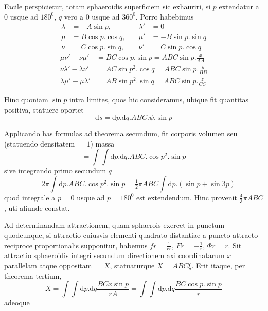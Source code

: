 \par
Facile perspicietur, totam sphaeroidis superficiem sic exhauriri, si $p$ extendatur a $0$ usque ad $180^0$, $q$ vero a $0$ usque ad $360^0$. Porro habebimus
\[
\begin{aligned}
\lambda&=-A\sin p, &\quad\lambda'&=0\\
\mu&=B\cos p.\cos q, &\quad\mu'&=-B\sin p.\sin q\\
\nu&=C\cos p.\sin q, &\quad\nu'&=C\sin p.\cos q
\end{aligned}
\]
\[
\begin{aligned}
\mu\nu'-\nu\mu'&=BC\cos p.\sin p=ABC\sin p.\frac{x}{AA}\\
\nu\lambda'-\lambda\nu'&=AC\sin p^2.\cos q=ABC\sin p.\frac{y}{BB}\\
\lambda\mu'-\mu\lambda'&=AB\sin p^2.\sin q=ABC\sin p.\frac{z}{CC}
\end{aligned}
\]
\par
Hinc quoniam $\sin p$ intra limites, quos hic consideramus, ubique fit quantitas positiva, statuere oportet
\[
\mathrm{d}s=\mathrm{d}p.\mathrm{d}q.ABC.\psi.\sin p
\]
\par
Applicando has formulas ad theorema secundum, fit corporis volumen seu (statuendo densitatem $=1$) massa
\[
=\int\!\int\mathrm{d}p.\mathrm{d}q.ABC.\cos p^2.\sin p
\]
sive integrando primo secundum $q$
\[
=2\pi\int\mathrm{d}p.ABC.\cos p^2.\sin p=\tfrac12\pi ABC\int\mathrm{d}p.(\sin p+\sin3p)
\]
quod integrale a $p=0$ usque ad $p=180^0$ est extendendum. Hinc provenit $\tfrac43\pi ABC$, uti aliunde constat.

\par
Ad determinandam attractionem, quam sphaerois exercet in punctum quodcunque, si attractio cuiusvis elementi quadrato distantiae a puncto attracto reciproce proportionalis supponitur, habemus $fr=\frac{1}{rr}$, $Fr=-\frac{1}{r}$, $\Phi r=r$. Sit attractio sphaeroidis integri secundum directionem axi coordinatarum $x$ parallelam atque oppositam $=X$, statuaturque $X=ABC\xi$. Erit itaque, per theorema tertium,
\[
X=\int\!\int\mathrm{d}p.\mathrm{d}q\frac{BCx\sin p}{rA}=\int\!\int\mathrm{d}p.\mathrm{d}q\frac{BC\cos p.\sin p}{r}
\]
adeoque
